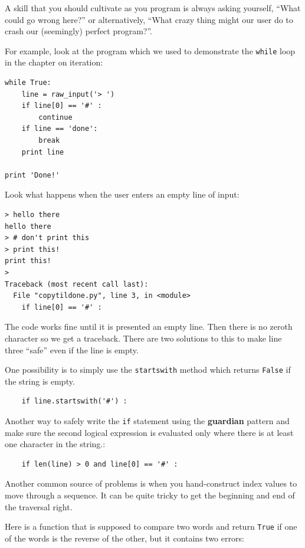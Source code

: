 \documentclass[10pt]{book}
\begin{document}
A skill that you should cultivate as you program is always
asking yourself, ``What could go wrong here?'' or alternatively,
``What crazy thing might our user do to crash our (seemingly) 
perfect program?''.

For example, look at the program which we used to demonstrate
the {\tt while} loop in the chapter on iteration:

\beforeverb
\begin{verbatim}
while True:
    line = raw_input('> ')
    if line[0] == '#' :
        continue
    if line == 'done':
        break
    print line

print 'Done!'
\end{verbatim}
\afterverb
%
Look what happens when the user enters an empty line of input:

\beforeverb
\begin{verbatim}
> hello there
hello there
> # don't print this
> print this!
print this!
> 
Traceback (most recent call last):
  File "copytildone.py", line 3, in <module>
    if line[0] == '#' :
\end{verbatim}
\afterverb
%
The code works fine until it is presented an empty line.  Then
there is no zeroth character so we get a traceback.  There are two
solutions to this to make line three ``safe'' even if the line is 
empty.

One possibility is to simply use the {\tt startswith} method
which returns {\tt False} if the string is empty.

\beforeverb
\begin{verbatim}
    if line.startswith('#') :
\end{verbatim}
\afterverb
%
Another way to safely write the {\tt if} statement using the {\bf guardian}
pattern and make sure the second logical expression is evaluated 
only where there is at least one character in the string.:

\beforeverb
\begin{verbatim}
    if len(line) > 0 and line[0] == '#' :
\end{verbatim}
\afterverb
%


Another common source of problems is when you hand-construct 
index values to move through a sequence.
It can be quite tricky to get the beginning and 
end of the traversal right. 

Here is a function that is supposed to compare two
words and return {\tt True} if one of the words is the reverse
of the other, but it contains two errors:
\end{document}
